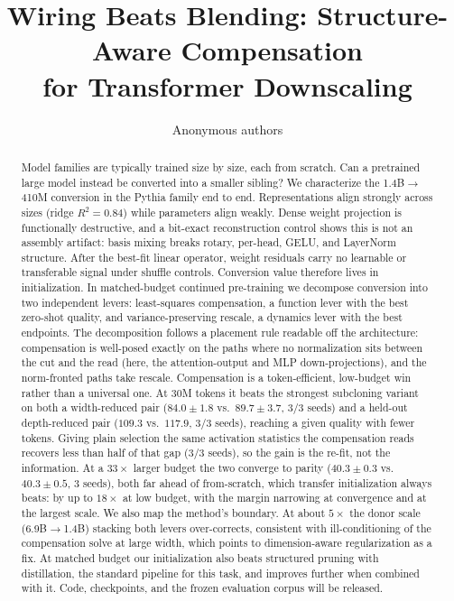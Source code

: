 \documentclass{article}
\title{Wiring Beats Blending: Structure-Aware Compensation\\for Transformer Downscaling}
\author{Anonymous authors}
\begin{document}
\maketitle

\begin{abstract}
Model families are typically trained size by size, each from scratch. Can a
pretrained large model instead be converted into a smaller sibling? We
characterize the 1.4B$\to$410M conversion in the Pythia family end to end.
Representations align strongly across sizes (ridge $R^2=0.84$) while parameters
align weakly. Dense weight projection is functionally destructive, and a
bit-exact reconstruction control shows this is not an assembly artifact: basis
mixing breaks rotary, per-head, GELU, and LayerNorm structure. After the
best-fit linear operator, weight residuals carry no learnable or transferable
signal under shuffle controls. Conversion value therefore lives in
initialization. In matched-budget continued pre-training we decompose conversion
into two independent levers: least-squares compensation, a function lever with
the best zero-shot quality, and variance-preserving rescale, a dynamics lever
with the best endpoints. The decomposition follows a placement rule readable
off the architecture: compensation is well-posed exactly on the paths where no
normalization sits between the cut and the read (here, the attention-output and
MLP down-projections), and the norm-fronted paths take rescale. Compensation is
a token-efficient, low-budget win rather than a universal one. At 30M tokens it beats the strongest subcloning
variant on both a width-reduced pair ($84.0\pm1.8$ vs.\ $89.7\pm3.7$, 3/3 seeds)
and a held-out depth-reduced pair ($109.3$ vs.\ $117.9$, 3/3 seeds), reaching a
given quality with fewer tokens. Giving plain selection the same activation
statistics the compensation reads recovers less than half of that gap (3/3
seeds), so the gain is the re-fit, not the information. At a $33\times$ larger
budget the two converge to parity ($40.3\pm0.3$ vs.\ $40.3\pm0.5$, 3 seeds),
both far ahead of from-scratch, which transfer
initialization always beats: by up to $18\times$ at low budget, with the margin
narrowing at convergence and at the largest scale. We also map the method's
boundary. At about $5\times$ the donor scale (6.9B$\to$1.4B) stacking both levers
over-corrects, consistent with ill-conditioning of the compensation solve at
large width, which points to dimension-aware regularization as a fix. At matched
budget our initialization also beats structured pruning with distillation, the
standard pipeline for this task, and improves further when combined with it.
Code, checkpoints, and the frozen evaluation corpus will be released.
\end{abstract}
\end{document}
